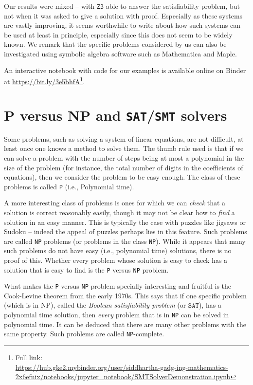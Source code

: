 \documentclass{amsart}
\theoremstyle{plain}
\theoremstyle{definition}
\theoremstyle{remark}
\begin{document}
Our results were mixed -- with \texttt{Z3} able to answer the satisfiability problem,
but not when it was asked to give a solution with proof.
Especially as these systems are vastly improving, it seems worthwhile to
write about how such systems can be used at least in principle,
especially since this does not seem to be widely known. We remark that the 
specific problems considered by us can also be investigated using symbolic algebra software such 
as Mathematica and Maple.

An interactive notebook with code for our examples is available online on Binder at 
\url{https://bit.ly/3e5bhfA}\footnote{Full link:\\\url{https://hub.gke2.mybinder.org/user/siddhartha-gadg-ing-mathematics-2x6efnix/notebooks/jupyter_notebook/SMTSolverDemonstration.ipynb}}.

\hypertarget{p-versus-np-and-satsmt-solvers}{%
	\section{P versus NP and \texttt{SAT}/\texttt{SMT}
	  solvers}\label{p-versus-np-and-satsmt-solvers}}

Some problems, such as solving a system of linear equations, are not
difficult, at least once one knows a method to solve them. The thumb
rule used is that if we can solve a problem with the number of steps
being at most a polynomial in the size of the problem (for instance, the
total number of digits in the coefficients of equations), then we
consider the problem to be easy enough. The class of these problems is
called \texttt{P} (i.e., Polynomial time).

A more interesting class of problems is ones for which we can
\emph{check} that a solution is correct reasonably easily, though it may
not be clear how to \emph{find} a solution in an easy manner. This is
typically the case with puzzles like jigsaws or Sudoku -- indeed the
appeal of puzzles perhaps lies in this feature. Such problems are called
\texttt{NP} problems (or problems in the class \texttt{NP}). While it appears that
many such problems do not have easy (i.e., polynomial time) solutions,
there is no proof of this. Whether every problem whose solution is easy
to check has a solution that is easy to find is the \texttt{P} versus \texttt{NP}
problem.

What makes the \texttt{P} versus \texttt{NP} problem specially interesting and fruitful is the
Cook-Levine theorem from the early 1970s. This says that if one specific
problem (which is in NP), called the \emph{Boolean satisfiability problem} (or
\(\texttt{SAT}\)), has a polynomial time solution, then \emph{every} problem that
is in \texttt{NP} can be solved in polynomial time. It can be deduced that
there are many other problems with the same property. Such problems are
called \texttt{NP}-complete.
\end{document}
